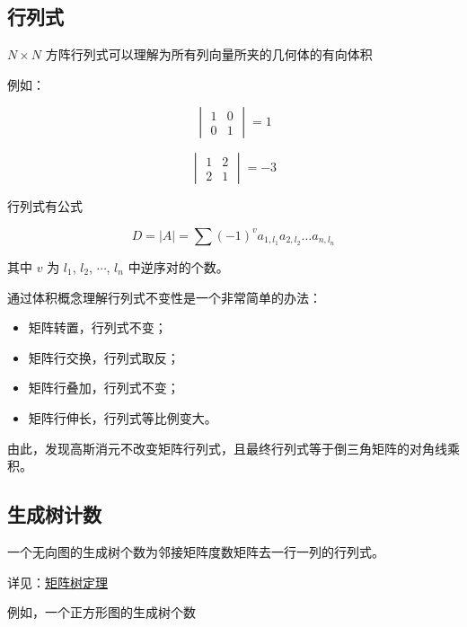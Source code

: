 \hr

\subsection{行列式}

$N \times N$ 方阵行列式可以理解为所有列向量所夹的几何体的有向体积

例如：

$$
\begin{vmatrix}
1 & 0 \\
0 & 1 \end{vmatrix} = 1
$$

$$
\begin{vmatrix}
1 & 2 \\
2 & 1 \end{vmatrix} = -3
$$

行列式有公式

$$
D = \left| A \right| = \sum(-1)^va_{1,l_1}a_{2,l_2}\dots a_{n,l_n}
$$

\begin{QUOTE}{}{}
其中 $v$ 为 $l_1$, $l_2$, $\cdots$, $l_n$ 中逆序对的个数。
\end{QUOTE}

通过体积概念理解行列式不变性是一个非常简单的办法：

\begin{itemize}
\item 矩阵转置，行列式不变；
\item 矩阵行交换，行列式取反；
\item 矩阵行叠加，行列式不变；
\item 矩阵行伸长，行列式等比例变大。
\end{itemize}

\begin{QUOTE}{}{}
由此，发现高斯消元不改变矩阵行列式，且最终行列式等于倒三角矩阵的对角线乘积。
\end{QUOTE}

\hr

\subsection{生成树计数}

一个无向图的生成树个数为邻接矩阵度数矩阵去一行一列的行列式。

详见：\href{/misc/matrix-tree/}{矩阵树定理}

例如，一个正方形图的生成树个数

